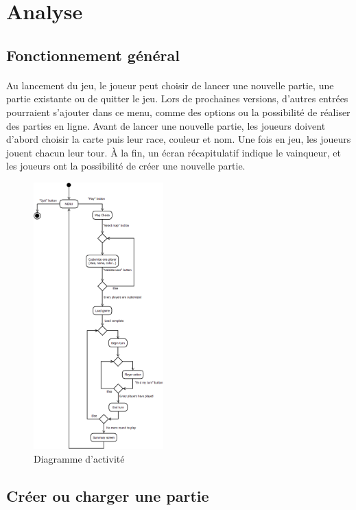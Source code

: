 \section{Analyse}

\subsection{Fonctionnement général}

\paragraph{}
Au lancement du jeu, le joueur peut choisir de lancer une nouvelle partie, une partie existante ou de quitter le jeu. Lors de prochaines versions, d'autres entrées pourraient s'ajouter dans ce menu, comme des options ou la possibilité de réaliser des parties en ligne. Avant de lancer une nouvelle partie, les joueurs doivent d'abord choisir la carte puis leur race, couleur et nom. Une fois en jeu, les joueurs jouent chacun leur tour. À la fin, un écran récapitulatif indique le vainqueur, et les joueurs ont la possibilité de créer une nouvelle partie.

\begin{figure}[h]
  \centering
  \includegraphics[width=5cm]{schemas/activity.png}
  \caption{Diagramme d'activité}
  \label{activity}
\end{figure}




\subsection{Créer ou charger une partie}

